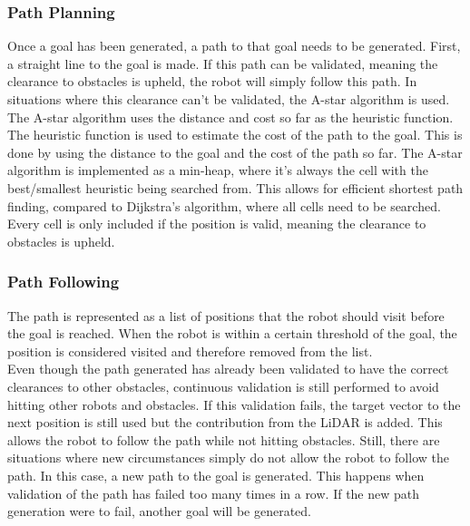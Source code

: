 \subsubsection{Path Planning}\label{sec:path_planning}
Once a goal has been generated, a path to that goal needs to be generated. First, a straight line to the goal is made. If this path can be validated, meaning the clearance to obstacles is upheld, the robot will simply follow this path.
In situations where this clearance can't be validated, the A-star algorithm is used.
The A-star algorithm uses the distance and cost so far as the heuristic function. The heuristic function is used to estimate the cost of the path to the goal. This is done by using the distance to the goal and the cost of the path so far. The A-star algorithm is implemented as a min-heap, where it's always the cell with the best/smallest heuristic being searched from. This allows for efficient shortest path finding, compared to Dijkstra's algorithm, where all cells need to be searched. Every cell is only included if the position is valid, meaning the clearance to obstacles is upheld.

\subsubsection{Path Following}\label{sec:path_following}
The path is represented as a list of positions that the robot should visit before the goal is reached. When the robot is within a certain threshold of the goal, the position is considered visited and therefore removed from the list. \\

Even though the path generated has already been validated to have the correct clearances to other obstacles, continuous validation is still performed to avoid hitting other robots and obstacles.
If this validation fails, the target vector to the next position is still used but the contribution from the LiDAR is added. This allows the robot to follow the path while not hitting obstacles. 
Still, there are situations where new circumstances simply do not allow the robot to follow the path. In this case, a new path to the goal is generated. This happens when validation of the path has failed too many times in a row. If the new path generation were to fail, another goal will be generated.



